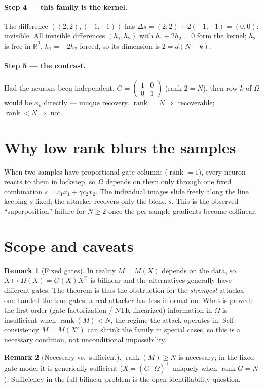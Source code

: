 \documentclass[11pt]{article}
\theoremstyle{definition}
\newtheorem*{remark}{Remark}
\newcommand{\R}{\mathbb{R}}
\newcommand{\rank}{\operatorname{rank}}
\newcommand{\Om}{\Omega}
\begin{document}
\paragraph{Step 4 --- this family is the kernel.} The difference $((2,2),(-1,-1))$ has
$\Delta s=(2,2)+2(-1,-1)=(0,0)$: invisible. All invisible differences $(h_1,h_2)$ with
$h_1+2h_2=0$ form the kernel; $h_2$ is free in $\R^2$, $h_1=-2h_2$ forced, so its dimension is
$2=d(N-k)$.

\paragraph{Step 5 --- the contrast.} Had the neurons been independent,
$G=\left(\begin{smallmatrix}1&0\\0&1\end{smallmatrix}\right)$ (rank $2=N$), then row $k$ of $\Om$
would be $x_k$ directly --- unique recovery. $\rank=N\Rightarrow$ recoverable;
$\rank<N\Rightarrow$ not.

\section{Why low rank blurs the samples}
When two samples have proportional gate columns ($\rank=1$), every neuron reacts to them in
lockstep, so $\Om$ depends on them only through one fixed combination $s=c_1x_1+\gamma c_2x_2$. The
individual images slide freely along the line keeping $s$ fixed; the attacker recovers only the
blend $s$. This is the observed ``superposition'' failure for $N\ge2$ once the per-sample gradients
become collinear.

\section{Scope and caveats}
\begin{remark}[Fixed gates]
In reality $M=M(X)$ depends on the data, so $X\mapsto\Om(X)=G(X)X^\top$ is bilinear and the
alternatives generally have different gates. The theorem is thus the obstruction for the
\emph{strongest} attacker --- one handed the true gates; a real attacker has less information.
What is proved: the first-order (gate-factorization / NTK-linearized) information in $\Om$ is
insufficient when $\rank(M)<N$, the regime the attack operates in. Self-consistency $M=M(X')$ can
shrink the family in special cases, so this is a necessary condition, not unconditional
impossibility.
\end{remark}
\begin{remark}[Necessary vs.\ sufficient]
$\rank(M)\ge N$ is necessary; in the fixed-gate model it is generically sufficient
($X=(G^{+}\Om)^\top$ uniquely when $\rank G=N$). Sufficiency in the full bilinear problem is the
open identifiability question.
\end{remark}
\end{document}
